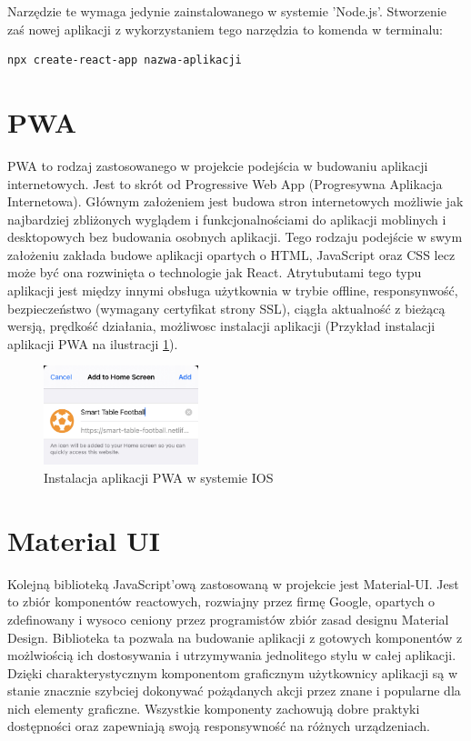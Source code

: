 Narzędzie te wymaga jedynie zainstalowanego w systemie 'Node.js'. Stworzenie zaś nowej aplikacji z wykorzystaniem tego narzędzia to komenda w terminalu:

\begin{lstlisting}[breaklines=true]
    npx create-react-app nazwa-aplikacji
\end{lstlisting}

\label{ch:frontend:pwa}
\section{PWA}
PWA to rodzaj zastosowanego w projekcie podejścia w budowaniu aplikacji internetowych. Jest to skrót od Progressive Web App (Progresywna Aplikacja Internetowa). Głównym założeniem jest budowa stron internetowych możliwie jak najbardziej zbliżonych wyglądem i funkcjonalnościami do aplikacji moblinych i desktopowych bez budowania osobnych aplikacji. Tego rodzaju podejście w swym założeniu zakłada budowe aplikacji opartych o HTML, JavaScript oraz CSS lecz może być ona rozwinięta o technologie jak React. Atrytubutami tego typu aplikacji jest między innymi obsługa użytkownia w trybie offline, responsynwość, bezpieczeństwo (wymagany certyfikat strony SSL), ciągła aktualność z bieżącą wersją, prędkość działania, możliwosc instalacji aplikacji (Przykład instalacji aplikacji PWA na ilustracji \ref{fig:pwa-installation}).

\begin{figure}[h!]
    \centering
    \includegraphics[width=0.4\textwidth]{images/player/PWA_install.jpg}
    \caption{Instalacja aplikacji PWA w systemie IOS}
    \label{fig:pwa-installation}
\end{figure}

\label{section:material-ui}
\section{Material UI}
Kolejną biblioteką JavaScript'ową zastosowaną w projekcie jest Material-UI. Jest to zbiór komponentów reactowych, rozwiajny przez firmę Google, opartych o zdefinowany i wysoco ceniony przez programistów zbiór zasad designu Material Design. Biblioteka ta pozwala na budowanie aplikacji z gotowych komponentów z możlwiością ich dostosywania i utrzymywania jednolitego stylu w całej aplikacji. Dzięki charakterystycznym komponentom graficznym użytkownicy aplikacji są w stanie znacznie szybciej dokonywać pożądanych akcji przez znane i popularne dla nich elementy graficzne. Wszystkie komponenty zachowują dobre praktyki dostępności oraz zapewniają swoją responsywność na różnych urządzeniach.

